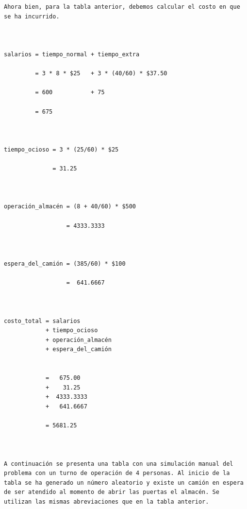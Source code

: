 \begin{verbatim}
Ahora bien, para la tabla anterior, debemos calcular el costo en que se ha incurrido.



salarios = tiempo_normal + tiempo_extra

         = 3 * 8 * $25   + 3 * (40/60) * $37.50

         = 600           + 75

         = 675



tiempo_ocioso = 3 * (25/60) * $25
              
              = 31.25



operación_almacén = (8 + 40/60) * $500

                  = 4333.3333



espera_del_camión = (385/60) * $100

                  =  641.6667

         

costo_total = salarios 
            + tiempo_ocioso 
            + operación_almacén
            + espera_del_camión


            =   675.00
            +    31.25
            +  4333.3333
            +   641.6667

            = 5681.25



A continuación se presenta una tabla con una simulación manual del problema con un turno de operación de 4 personas. Al inicio de la tabla se ha generado un número aleatorio y existe un camión en espera de ser atendido al momento de abrir las puertas el almacén. Se utilizan las mismas abreviaciones que en la tabla anterior.



\end{verbatim}
